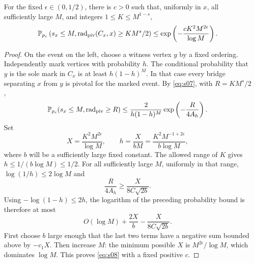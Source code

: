 \begin{lemma}\label{good:radius-tail}
For the fixed $\epsilon\in(0,1/2)$, there is $c>0$ such that, uniformly
in $x$, all sufficiently large $M$, and integers
$1\le K\le M^{1-s}$,
\begin{equation}\label{eq:s08}
 \mathbb P_{p_c}\left(s_x\le M,
     \operatorname{rad}_{\mathrm{piv}}(C_x,x)\ge KM^s/2\right)
 \le\exp\left(-\frac{cK^2M^{2\epsilon}}{\log M}\right).
\end{equation}
\end{lemma}
\begin{proof}
On the event on the left, choose a witness vertex $y$ by a fixed
ordering. Independently mark vertices with probability $h$. The
conditional probability that $y$ is the sole mark in $C_x$ is at
least $h(1-h)^M$. In that case every bridge separating $x$ from $y$
is pivotal for the marked event. By \eqref{eq:s07}, with $R=KM^s/2$,
\[
 \mathbb P_{p_c}(s_x\le M,\operatorname{rad}_{\mathrm{piv}}\ge R)
 \le\frac{2}{h(1-h)^M}\exp\left(-\frac{R}{4A_h}\right).
\]
Set
\[
 X=\frac{K^2M^{2\epsilon}}{\log M},\qquad
 h=\frac{X}{bM}
   =\frac{K^2M^{-1+2\epsilon}}{b\log M},
\]
where $b$ will be a sufficiently large fixed constant. The allowed
range of $K$ gives $h\le1/(b\log M)\le1/2$. For all sufficiently
large $M$, uniformly in that range,
$\log(1/h)\le2\log M$ and
\[
 \frac{R}{4A_h}\ge\frac{X}{8C\sqrt{2b}}.
\]
Using $-\log(1-h)\le2h$, the logarithm of the preceding probability
bound is therefore at most
\[
 O(\log M)+\frac{2X}{b}-\frac{X}{8C\sqrt{2b}}.
\]
First choose $b$ large enough that the last two terms have a negative
sum bounded above by $-c_1X$. Then increase $M$: the minimum possible
$X$ is $M^{2\epsilon}/\log M$, which dominates $\log M$. This proves
\eqref{eq:s08} with a fixed positive $c$.
\end{proof}

